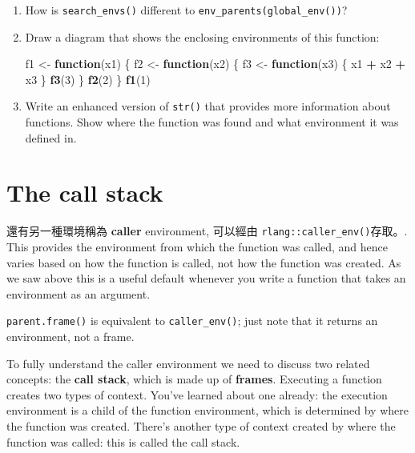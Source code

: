 \documentclass[]{book}
\newenvironment{Shaded}{\begin{snugshade}}{\end{snugshade}}
\newcommand{\ControlFlowTok}[1]{\textcolor[rgb]{0.13,0.29,0.53}{\textbf{#1}}}
\newcommand{\DecValTok}[1]{\textcolor[rgb]{0.00,0.00,0.81}{#1}}
\newcommand{\KeywordTok}[1]{\textcolor[rgb]{0.13,0.29,0.53}{\textbf{#1}}}
\newcommand{\NormalTok}[1]{#1}
\newcommand{\OperatorTok}[1]{\textcolor[rgb]{0.81,0.36,0.00}{\textbf{#1}}}
\newcommand{\StringTok}[1]{\textcolor[rgb]{0.31,0.60,0.02}{#1}}
\theoremstyle{definition}
\theoremstyle{definition}
\theoremstyle{definition}
\theoremstyle{remark}
\begin{document}
\begin{enumerate}
\def\labelenumi{\arabic{enumi}.}
\item
  How is \texttt{search\_envs()} different to
  \texttt{env\_parents(global\_env())}?
\item
  Draw a diagram that shows the enclosing environments of this function:

\begin{Shaded}
\begin{Highlighting}[]
\NormalTok{f1 <-}\StringTok{ }\ControlFlowTok{function}\NormalTok{(x1) \{}
\NormalTok{  f2 <-}\StringTok{ }\ControlFlowTok{function}\NormalTok{(x2) \{}
\NormalTok{    f3 <-}\StringTok{ }\ControlFlowTok{function}\NormalTok{(x3) \{}
\NormalTok{      x1 }\OperatorTok{+}\StringTok{ }\NormalTok{x2 }\OperatorTok{+}\StringTok{ }\NormalTok{x3}
\NormalTok{    \}}
    \KeywordTok{f3}\NormalTok{(}\DecValTok{3}\NormalTok{)}
\NormalTok{  \}}
  \KeywordTok{f2}\NormalTok{(}\DecValTok{2}\NormalTok{)}
\NormalTok{\}}
\KeywordTok{f1}\NormalTok{(}\DecValTok{1}\NormalTok{)}
\end{Highlighting}
\end{Shaded}
\item
  Write an enhanced version of \texttt{str()} that provides more
  information about functions. Show where the function was found and
  what environment it was defined in.
\end{enumerate}

\hypertarget{the-call-stack}{%
\section{The call stack}\label{the-call-stack}}

還有另一種環境稱為 \textbf{caller} environment, 可以經由
\texttt{rlang::caller\_env()}存取。. This provides the environment from
which the function was called, and hence varies based on how the
function is called, not how the function was created. As we saw above
this is a useful default whenever you write a function that takes an
environment as an argument.

\texttt{parent.frame()} is equivalent to \texttt{caller\_env()}; just
note that it returns an environment, not a frame.

To fully understand the caller environment we need to discuss two
related concepts: the \textbf{call stack}, which is made up of
\textbf{frames}. Executing a function creates two types of context.
You've learned about one already: the execution environment is a child
of the function environment, which is determined by where the function
was created. There's another type of context created by where the
function was called: this is called the call stack.
\end{document}
